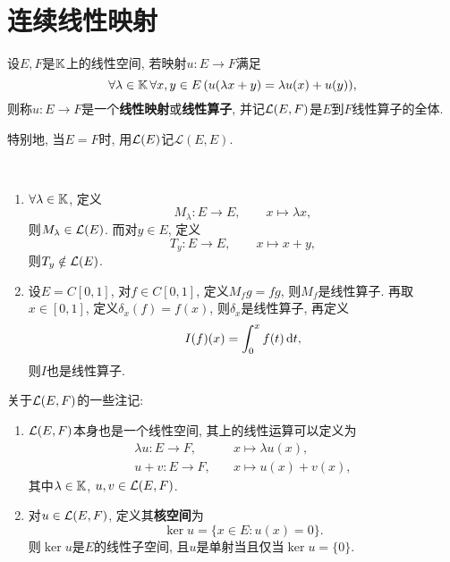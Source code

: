 \section{连续线性映射}

    \begin{Definition}
        设$ E, F $是$ \mathbb{K} $上的线性空间, 若映射$ u : E\to F $满足
        \[
            \forall \lambda\in\mathbb{K}\,\forall x,y\in E\,(u(\lambda x+y)=\lambda u(x)+u(y)),
        \]
        则称$ u : E\to F $是一个\textbf{线性映射}或\textbf{线性算子}, 并记$ \mathcal{L}(E,F) $是$ E $到$ F $线性算子的全体.
    \end{Definition}

    特别地, 当$ E=F $时, 用$ \mathcal{L}(E) $记$ \mathcal{L}(E,E) $.

    \begin{Example}~
    \begin{enumerate}[(1)]
        \item $ \forall \lambda\in\mathbb{K} $, 定义
        \[
            M_\lambda : E\to E,\qquad x\mapsto\lambda x,
        \]
        则$ M_\lambda\in\mathcal{L}(E) $. 而对$ y\in E $, 定义
        \[
            T_y : E\to E,\qquad x\mapsto x+y,
        \]
        则$ T_y\notin\mathcal{L}(E) $.

        \item 设$ E=C[0,1] $, 对$ f\in C[0,1] $, 定义$ M_fg=fg $, 则$ M_f $是线性算子. 再取$ x\in[0,1] $, 定义$ \delta_x(f)=f(x) $, 则$ \delta_x $是线性算子, 再定义
        \[
            I(f)(x)=\int_0^xf(t)\,\mathrm{d} t,
        \]
    则$ I $也是线性算子.
    \end{enumerate}
    \end{Example}

    \begin{Remark}
        关于$ \mathcal{L}(E,F) $的一些注记:
    \begin{enumerate}[(1)]
    \item $ \mathcal{L}(E,F) $本身也是一个线性空间, 其上的线性运算可以定义为
    \[
        \begin{aligned}
            \lambda u : E\to F,& \quad x\mapsto\lambda u(x),\\
            u+v : E\to F,& \quad x\mapsto u(x)+v(x),
        \end{aligned}
    \]
    其中$ \lambda\in\mathbb{K} $, $ u, v\in\mathcal{L}(E,F) $.

    \item 对$ u\in\mathcal{L}(E,F) $, 定义其\textbf{核空间}为
    \[
    \ker u=\{ x\in E : u(x)=0 \}.
    \]
    则$ \ker u $是$ E $的线性子空间, 且$ u $是单射当且仅当$ \ker u=\{0\} $.
    \end{enumerate}
    \end{Remark}

